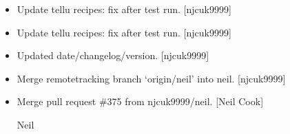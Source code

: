 \documentclass[a4paper,10pt,english]{report}
\begin{document}
\begin{itemize}
\item {} 
Update tellu recipes: fix after test run. {[}njcuk9999{]}

\item {} 
Update tellu recipes: fix after test run. {[}njcuk9999{]}

\item {} 
Updated date/changelog/version. {[}njcuk9999{]}

\item {} 
Merge remote\sphinxhyphen{}tracking branch ‘origin/neil’ into neil. {[}njcuk9999{]}

\item {} 
Merge pull request \#375 from njcuk9999/neil. {[}Neil Cook{]}

Neil

\end{itemize}
\end{document}
